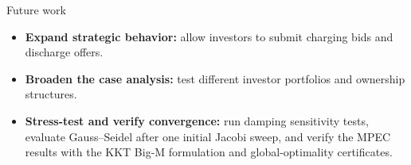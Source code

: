 \documentclass[10pt]{beamer}
\begin{document}
\begin{frame}{Future work}
\vfill

\begin{itemize}
    \setlength{\itemsep}{0.45cm}
    \item \textbf{Expand strategic behavior:} allow investors to submit charging bids and discharge offers.
    \item \textbf{Broaden the case analysis:} test different investor portfolios and ownership structures.
    \item \textbf{Stress-test and verify convergence:} run damping sensitivity tests, evaluate Gauss--Seidel after one initial Jacobi sweep, and verify the MPEC results with the KKT Big-M formulation and global-optimality certificates.
\end{itemize}

\vfill
\end{frame}
\end{document}
